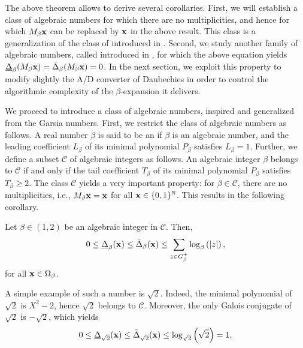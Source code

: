 	The above theorem allows to derive several corollaries. First, we will establish a class of algebraic numbers for which there are no multiplicities, and hence for which $M_\beta{\bf x}$ can be replaced by ${\bf x}$ in the above result. This class is a generalization of the class of  introduced in \cite[Section 1.7]{garsia1962ArithmeticPropertiesBernoulli}. Second, we study another family of algebraic numbers, called  introduced in \cite{pisotRepartitionModulo1}, for which the above equation yields $\underline\Delta_\beta(M_\beta{\bf x}) = \bar\Delta_\beta(M_\beta{\bf x}) = 0$. In the next section, we exploit this property to modify slightly the A/D converter of Daubechies in order to control the algorithmic complexity of the $\beta$-expansion it delivers.

	We proceed to introduce a class of algebraic numbers, inspired and generalized from the Garsia numbers. First, we restrict the class of algebraic numbers as follows. A real number $\beta$ is said to be an  if $\beta$ is an algebraic number, and the leading coefficient $L_\beta$ of its minimal polynomial $P_\beta$ satisfies $L_\beta = 1$. Further, we define a subset $\mathscr C$ of algebraic integers as follows. An algebraic integer $\beta$ belongs to $\mathscr C$ if and only if the tail coefficient $T_\beta$ of its minimal polynomial $P_\beta$ satisfies $T_\beta \geq 2$. The class $\mathscr C$ yields a very important property: for $\beta \in \mathscr C$, there are no multiplicities, i.e., $M_\beta {\bf x} = {\bf x}$ for all ${\bf x} \in \{0,1\}^{\mathbb{N}}$. This results in the following corollary.
	\begin{corollary}\label{thm:upper bound on the relative compressibility of beta expansions for garsia beta}
		Let $\beta \in (1,2)$ be an algebraic integer in $\mathscr C$. Then,
		\begin{equation}
			0 \leq \underline\Delta_\beta({\bf x}) \leq \bar\Delta_\beta({\bf x}) \leq \sum_{z \in G^+_\beta} \log_\beta\left( \left|z \right|\right),
		\end{equation}
		for all ${\bf x} \in \Omega_\beta$.
	\end{corollary}
	A simple example of such a number is $\sqrt{2}$. Indeed, the minimal polynomial of $\sqrt{2}$ is $X^2 - 2$, hence $\sqrt{2}$ belongs to $\mathscr C$. Moreover, the only Galois conjugate of $\sqrt{2}$ is $-\sqrt{2}$, which yields
	\begin{equation}
		0 \leq \underline\Delta_{\sqrt{2}}({\bf x}) \leq \bar\Delta_{\sqrt{2}}({\bf x}) \leq  \log_{\sqrt{2}}\left( \sqrt{2}\right) = 1,
	\end{equation}
